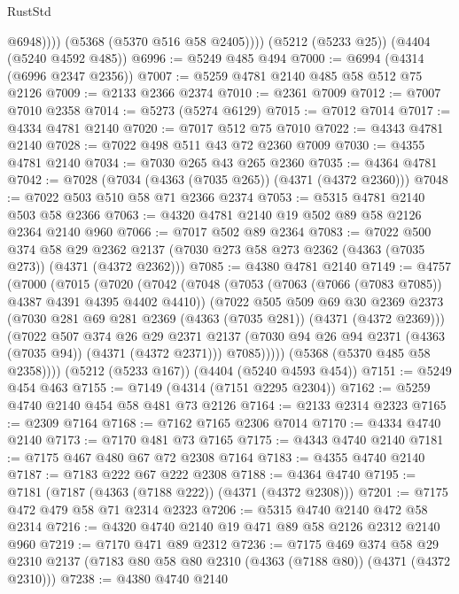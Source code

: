 \begin{lexlean}{RustStd}
\begin{coremodule}
{\begin{coremodule}
{{{{{{{{{{{{{{{{                @6948))))
        (@5368 (@5370 @516 @58 @2405))))
    (@5212 (@5233 @25))
    (@4404 (@5240 @4592 @485))
@6996 := @5249 @485 @494
@7000 := @6994 (@4314 (@6996 @2347 @2356))
@7007 := @5259 @4781 @2140 @485 @58 @512 @75 @2126
@7009 := @2133 @2366 @2374
@7010 := @2361 @7009
@7012 := @7007 @7010 @2358
@7014 := @5273 (@5274 @6129)
@7015 := @7012 @7014
@7017 := @4334 @4781 @2140
@7020 := @7017 @512 @75 @7010
@7022 := @4343 @4781 @2140
@7028 := @7022 @498 @511 @43 @72 @2360 @7009
@7030 := @4355 @4781 @2140
@7034 := @7030 @265 @43 @265 @2360
@7035 := @4364 @4781
@7042 := @7028 (@7034 (@4363 (@7035 @265)) (@4371 (@4372 @2360)))
@7048 := @7022 @503 @510 @58 @71 @2366 @2374
@7053 := @5315 @4781 @2140 @503 @58 @2366
@7063 := @4320 @4781 @2140 @19 @502 @89 @58 @2126 @2364 @2140 @960
@7066 := @7017 @502 @89 @2364
@7083 := @7022
    @500
    @374
    @58
    @29
    @2362
    @2137
    (@7030 @273 @58 @273 @2362 (@4363 (@7035 @273)) (@4371 (@4372 @2362)))
@7085 := @4380 @4781 @2140
@7149 := @4757
    (@7000
      (@7015
        (@7020
          (@7042
            (@7048
              (@7053 (@7063 (@7066 (@7083 @7085)) @4387 @4391 @4395 @4402 @4410))
              (@7022
                @505
                @509
                @69
                @30
                @2369
                @2373
                (@7030 @281 @69 @281 @2369 (@4363 (@7035 @281)) (@4371 (@4372 @2369)))
                (@7022
                  @507
                  @374
                  @26
                  @29
                  @2371
                  @2137
                  (@7030 @94 @26 @94 @2371 (@4363 (@7035 @94)) (@4371 (@4372 @2371)))
                  @7085)))))
        (@5368 (@5370 @485 @58 @2358))))
    (@5212 (@5233 @167))
    (@4404 (@5240 @4593 @454))
@7151 := @5249 @454 @463
@7155 := @7149 (@4314 (@7151 @2295 @2304))
@7162 := @5259 @4740 @2140 @454 @58 @481 @73 @2126
@7164 := @2133 @2314 @2323
@7165 := @2309 @7164
@7168 := @7162 @7165 @2306 @7014
@7170 := @4334 @4740 @2140
@7173 := @7170 @481 @73 @7165
@7175 := @4343 @4740 @2140
@7181 := @7175 @467 @480 @67 @72 @2308 @7164
@7183 := @4355 @4740 @2140
@7187 := @7183 @222 @67 @222 @2308
@7188 := @4364 @4740
@7195 := @7181 (@7187 (@4363 (@7188 @222)) (@4371 (@4372 @2308)))
@7201 := @7175 @472 @479 @58 @71 @2314 @2323
@7206 := @5315 @4740 @2140 @472 @58 @2314
@7216 := @4320 @4740 @2140 @19 @471 @89 @58 @2126 @2312 @2140 @960
@7219 := @7170 @471 @89 @2312
@7236 := @7175
    @469
    @374
    @58
    @29
    @2310
    @2137
    (@7183 @80 @58 @80 @2310 (@4363 (@7188 @80)) (@4371 (@4372 @2310)))
@7238 := @4380 @4740 @2140
}}}}}}}}}}}}}}}}
\end{coremodule}}
\end{coremodule}
\end{lexlean}
